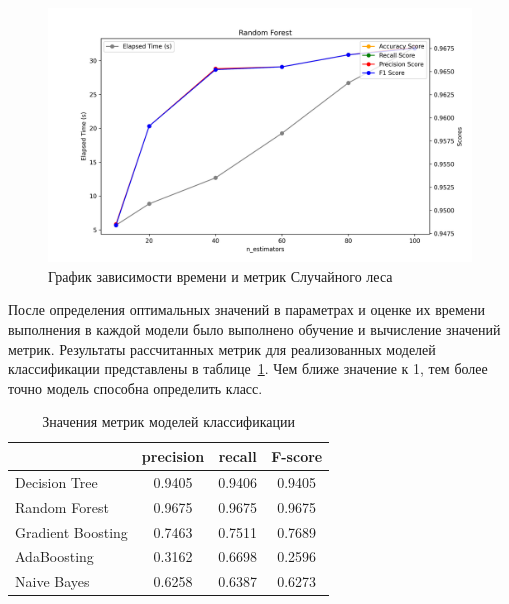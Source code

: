 \begin{figure}[h]
    \centering
    \includegraphics[width=1\linewidth]{pic/statistic/random_forest.png}
    \vspace{0.5em}\caption{График зависимости времени и метрик Случайного леса}
    \label{ris:graph}
\end{figure}
\vspace{1em}

После определения оптимальных значений в параметрах и оценке их времени выполнения в каждой модели было выполнено обучение и вычисление значений метрик. Результаты рассчитанных метрик для реализованных моделей классификации представлены в таблице~\ref{tabular:table-classification}. Чем ближе значение к 1, тем более точно модель способна определить класс.

\begin{table}[H]
    \onehalfspacing 
    \caption{Значения метрик моделей классификации}
    \medskip
        \begin{tabular}{|l|c|c|c|}
        \hline
        \backslashbox{}{}  & precision & recall & F-score \\ \hline
            Decision Tree & 0.9405 & 0.9406 & 0.9405 \\  \hline 
            Random Forest & 0.9675 & 0.9675 & 0.9675 \\  \hline 
            Gradient Boosting & 0.7463 & 0.7511 & 0.7689 \\  \hline 
            AdaBoosting & 0.3162 & 0.6698 & 0.2596 \\  \hline 
            Naive Bayes & 0.6258 & 0.6387 & 0.6273 \\  \hline 
        \end{tabular}
    \label{tabular:table-classification}
\end{table}
\vspace{1em}

